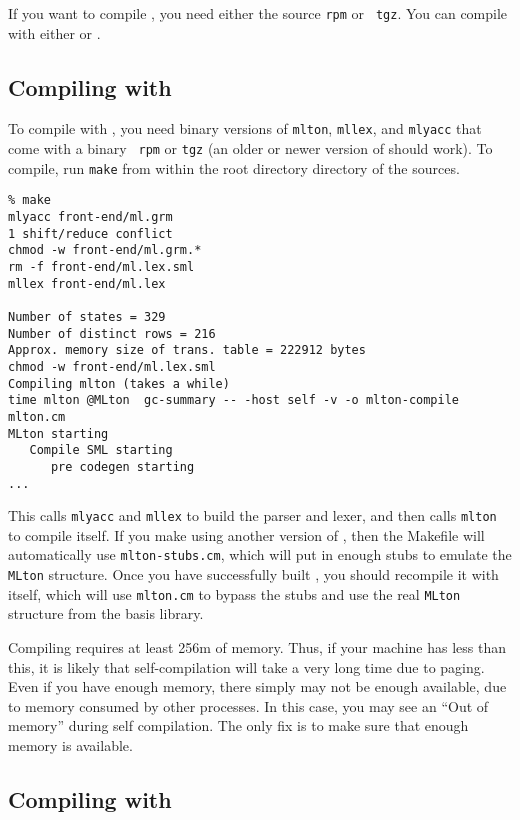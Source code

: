 
If you want to compile {\mlton}, you need either the source {\tt rpm} or {\tt
tgz}.  You can compile with either {\mlton} or {\smlnj}.

\subsection{Compiling with {\mlton}}

To compile with {\mlton}, you need binary versions of {\tt mlton},
{\tt mllex}, and {\tt mlyacc} that come with a {\mlton} binary {\tt
rpm} or {\tt tgz} (an older or newer version of {\mlton} should work).
To compile, run {\tt make} from within the root directory directory of the
sources.
\begin{verbatim}
% make
mlyacc front-end/ml.grm
1 shift/reduce conflict
chmod -w front-end/ml.grm.*
rm -f front-end/ml.lex.sml
mllex front-end/ml.lex

Number of states = 329
Number of distinct rows = 216
Approx. memory size of trans. table = 222912 bytes
chmod -w front-end/ml.lex.sml
Compiling mlton (takes a while)
time mlton @MLton  gc-summary -- -host self -v -o mlton-compile mlton.cm
MLton starting
   Compile SML starting
      pre codegen starting
...
\end{verbatim}
This calls {\tt mlyacc} and {\tt mllex} to build the parser and lexer, and then
calls {\tt mlton} to compile itself.  If you make {\mlton} using another version
of {\mlton}, then the Makefile will automatically use {\tt mlton-stubs.cm},
which will put in enough stubs to emulate the {\tt MLton} structure.  Once you
have successfully built {\mlton}, you should recompile it with itself, which
will use {\tt mlton.cm} to bypass the stubs and use the real {\tt MLton}
structure from the basis library.

Compiling {\mlton} requires at least 256m of memory.  Thus, if your machine has
less than this, it is likely that self-compilation will take a very long time
due to paging.  Even if you have enough memory, there simply may not be enough
available, due to memory consumed by other processes.  In this case, you may
see an ``Out of memory'' during self compilation.  The only fix is to make sure
that enough memory is available.

\subsection{Compiling with {\smlnj}}

